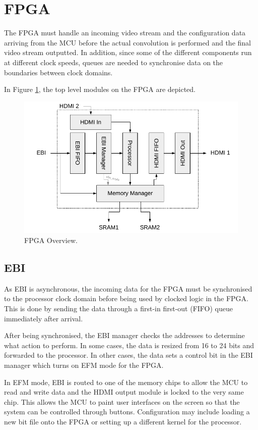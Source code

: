 \section{FPGA}
The FPGA must handle an incoming video stream and the configuration data arriving from the MCU before the actual convolution is performed and the final video stream outputted. In addition, since some of the different components run at different clock speeds, queues are needed to synchronise data on the boundaries between clock domains.

In Figure \ref{fig:FpgaOverview}, the top level modules on the FPGA are depicted.

\begin{figure}[h]
    \centering
    \includegraphics{img/FpgaOverview}
    \caption{FPGA Overview.}
    \label{fig:FpgaOverview}
\end{figure}

\subsection{EBI}
As EBI is asynchronous, the incoming data for the FPGA must be synchronised to the processor clock domain before being used by clocked logic in the FPGA.
This is done by sending the data through a first-in first-out (FIFO) queue immediately after arrival.

After being synchronised, the EBI manager checks the addresses to determine what action to perform. In some cases, the data is resized from 16 to 24 bits and forwarded to the processor. In other cases, the data sets a control bit in the EBI manager which turns on EFM mode for the FPGA.

In EFM mode, EBI is routed to one of the memory chips to allow the MCU to read and write data and the HDMI output module is locked to the very same chip.
This allows the MCU to paint user interfaces on the screen so that the system can be controlled through buttons.
Configuration may include loading a new bit file onto the FPGA or setting up a different kernel for the processor.


